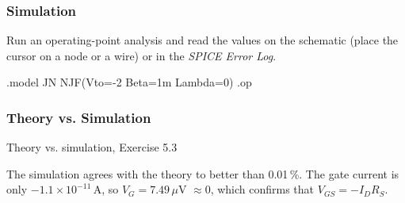 \subsubsection*{Simulation}
Run an operating-point analysis and read the values on the schematic (place the cursor on a node or a wire) or in the \textit{SPICE Error Log}.
\begin{spice}
.model JN NJF(Vto=-2 Beta=1m Lambda=0)
.op
\end{spice}

\subsubsection*{Theory vs. Simulation}
\begin{comparison}{Theory vs. simulation, Exercise 5.3}
\end{comparison}
\begin{solution}
The simulation agrees with the theory to better than 0.01\,\%. The gate current is only $-1.1\times10^{-11}$\,A, so
$V_G = 7.49\,\mu$V $\approx 0$, which confirms that $V_{GS} = -I_D R_S$.
\end{solution}
